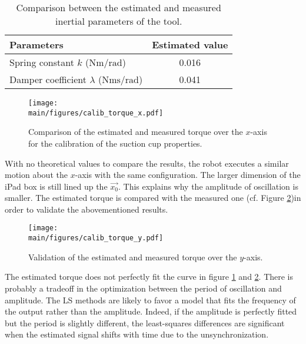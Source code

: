 \documentclass[/home/francois/latex/report/main.tex]{subfiles}
\begin{document}
\begin{table}[h]
  \begin{center}
    \renewcommand{\arraystretch}{1.2} %
    \begin{tabular}{l|c} %
      \textbf{Parameters} & \textbf{Estimated value} \\
      \hline
      Spring constant $k$ ($\si{\newton\meter\per\radian}$) & 0.016\\
      \hline
      Damper coefficient $\lambda$ ($\si{\newton\meter\second\per\radian}$) & 0.041 \\
      \hline
    \end{tabular}
  \end{center}
  \caption{Comparison between the estimated and measured inertial parameters of the tool.\label{tab:results:calibration-cup}}
\end{table}

\begin{figure}
  \centering
    \texttt{[image: \\main/figures/calib\_torque\_x.pdf]}
  \caption{Comparison of the estimated and measured torque over the $x$-axis for the calibration of the suction cup properties.}
  \label{fig:results:calibration:suction-torque-x}
\end{figure}

With no theoretical values to compare the results, the robot executes a similar motion about the $x$-axis with the same configuration. The larger dimension of the iPad box is still lined up the $\overrightarrow{x_0}$. This explains why the amplitude of oscillation is smaller. The estimated torque is compared with the measured one (cf. Figure \ref{fig:results:calibration:suction-torque-y})in order to validate the abovementioned results.

\begin{figure}
  \centering
  \texttt{[image: \\main/figures/calib\_torque\_y.pdf]}
  \caption{Validation of the estimated and measured torque over the $y$-axis.}
  \label{fig:results:calibration:suction-torque-y}
\end{figure}

The estimated torque does not perfectly fit the curve in figure \ref{fig:results:calibration:suction-torque-x} and \ref{fig:results:calibration:suction-torque-y}. There is probably a tradeoff in the optimization between the period of oscillation and amplitude. The \ac{LS} methods are likely to favor a model that fits the frequency of the output rather than the amplitude. Indeed, if the amplitude is perfectly fitted but the period is slightly different, the least-squares differences are significant when the estimated signal shifts with time due to the unsynchronization.
\end{document}
